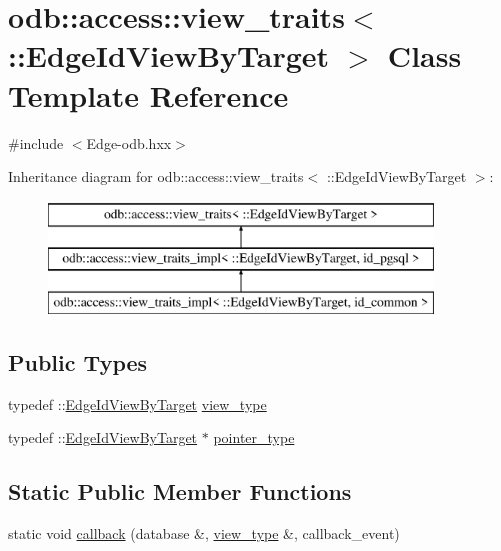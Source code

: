 \hypertarget{classodb_1_1access_1_1view__traits_3_01_1_1_edge_id_view_by_target_01_4}{}\section{odb\+:\+:access\+:\+:view\+\_\+traits$<$ \+:\+:Edge\+Id\+View\+By\+Target $>$ Class Template Reference}
\label{classodb_1_1access_1_1view__traits_3_01_1_1_edge_id_view_by_target_01_4}


{\ttfamily \#include $<$Edge-\/odb.\+hxx$>$}

Inheritance diagram for odb\+:\+:access\+:\+:view\+\_\+traits$<$ \+:\+:Edge\+Id\+View\+By\+Target $>$\+:\begin{figure}[H]
\begin{center}
\leavevmode
\includegraphics[height=3.000000cm]{d1/db1/classodb_1_1access_1_1view__traits_3_01_1_1_edge_id_view_by_target_01_4}
\end{center}
\end{figure}
\subsection*{Public Types}
\begin{DoxyCompactItemize}
\item 
typedef \+::\hyperlink{struct_edge_id_view_by_target}{Edge\+Id\+View\+By\+Target} \hyperlink{classodb_1_1access_1_1view__traits_3_01_1_1_edge_id_view_by_target_01_4_a9f04db81fe2177f9be477b512f390b40}{view\+\_\+type}
\item 
typedef \+::\hyperlink{struct_edge_id_view_by_target}{Edge\+Id\+View\+By\+Target} $\ast$ \hyperlink{classodb_1_1access_1_1view__traits_3_01_1_1_edge_id_view_by_target_01_4_a016b31c7c3b4687fcfacac887823b429}{pointer\+\_\+type}
\end{DoxyCompactItemize}
\subsection*{Static Public Member Functions}
\begin{DoxyCompactItemize}
\item 
static void \hyperlink{classodb_1_1access_1_1view__traits_3_01_1_1_edge_id_view_by_target_01_4_ac31b4ba10bfc92527ae07e22360b6777}{callback} (database \&, \hyperlink{classodb_1_1access_1_1view__traits_3_01_1_1_edge_id_view_by_target_01_4_a9f04db81fe2177f9be477b512f390b40}{view\+\_\+type} \&, callback\+\_\+event)
\end{DoxyCompactItemize}


